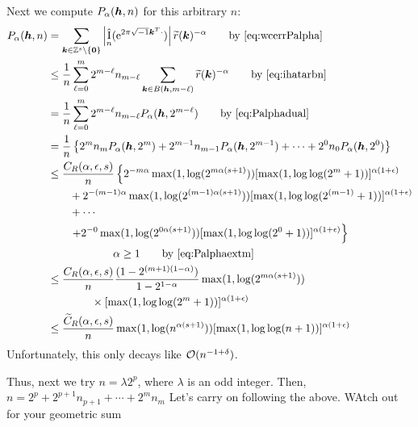 \documentclass{amsart}
\newcommand{\tr}{\widetilde{r}}
\DeclareMathOperator{\appxint}{\hat{I}}
\newcommand{\FredNote}[1]{{\color{blue}#1}}
\begin{document}
Next we compute $P_\alpha(\boldsymbol{h},n)$ for this arbitrary $n$:
\begin{align*}
      P_\alpha(\vh,n) & = \sum_{\vk \in \integers^s \setminus\{\vzero\}} \abs{\appxint_n(\me^{2 \pi \sqrt{-1} \vk^T \cdot})}\tr(\vk)^{-\alpha} \qquad \text{by \eqref{eq:wcerrPalpha}} \\
      & \le \frac {1}{n} \sum_{\ell = 0}^{m} 2^{m-\ell} n_{m - \ell} \sum_{\vk \in B(\vh,m-\ell)} \tr(\vk)^{-\alpha} 
      \qquad \text{by \eqref{eq:ihatarbn}}\\
      & = \frac {1}{n} \sum_{\ell = 0}^{m} 2^{m-\ell} n_{m - \ell} P_\alpha(\vh,2^{m-\ell}) 
      \qquad \text{by \eqref{eq:Palphadual}}\\
      & =  \frac {1}{n} \left\{ 2^m n_m P_\alpha(\vh,2^m) + 2^{m-1} n_{m-1} P_\alpha(\vh,2^{m-1}) + \cdots + 2^0 n_0 P_\alpha(\vh,2^0)  \right\} \\
      & \le \frac {C_{R}(\alpha,\epsilon,s)}{n} \left\{ 2^{-m\alpha}\max(1, \log(2^{m\alpha(s+1)})) [\max(1,\log \log (
    2^m+1))]^{\alpha(1+\epsilon)}\right .\\
      & \qquad  + 2^{-(m-1)\alpha}\max(1, \log(2^{(m-1)\alpha(s+1)})) [\max(1,\log \log (
    2^{(m-1)}+1))]^{\alpha(1+\epsilon)}\\
      & \qquad + \cdots \\
      & \qquad  \left . + 2^{-0}\max(1, \log(2^{0\alpha(s+1)})) [\max(1,\log \log (
    2^{0}+1))]^{\alpha(1+\epsilon)} \right\}\\
      & \qquad \qquad \qquad \alpha \ge 1 \qquad \text{by \eqref{eq:Palphaextm}}\\
      & \le \frac {C_{R}(\alpha,\epsilon,s)}{n} \frac{(1 - 2^{(m+1)(1-\alpha)})}{1 - 2^{1-\alpha}}
      \max(1, \log(2^{m\alpha(s+1)})) \\
      & \qquad \qquad \times [\max(1,\log \log (
    2^m+1))]^{\alpha(1+\epsilon)} \\
      & \le \frac {\widetilde{C}_{R}(\alpha,\epsilon,s)}{n}
      \max(1, \log(n^{\alpha(s+1)}))
      [\max(1,\log \log (
    n+1))]^{\alpha(1+\epsilon)}
\end{align*}
Unfortunately, this only decays like $\operatorname{{\mathcal O}}(n^{-1+\delta})$.    


Thus, next we try $n = \lambda 2^p$, where $\lambda$ is an odd integer. Then, $n = 2^p + 2^{p+1}n_{p+1} + \cdots + 2^m n_m$
\FredNote{Let's carry on following the above.  WAtch out for your geometric sum} \\
\end{document}

